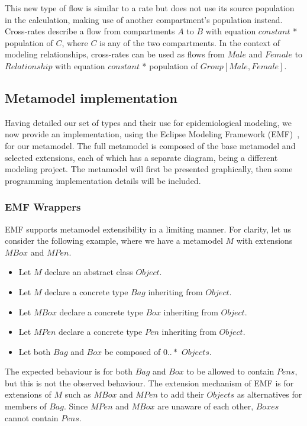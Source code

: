 This new type of flow is similar to a rate but does not use its source population in the calculation, making use of another compartment's population instead. Cross-rates describe a flow from compartments $A$ to $B$ with equation $constant$ * population of $C$, where $C$ is any of the two compartments. In the context of modeling relationships, cross-rates can be used as flows from $Male$ and $Female$ to $Relationship$ with equation $constant$ * population of $Group[Male, Female]$.

\subsection{Metamodel implementation}

Having detailed our set of types and their use for epidemiological modeling, we now provide an implementation, using the Eclipse Modeling Framework (EMF)~\cite{steinberg2008emf}, for our metamodel. The full metamodel is composed of the base metamodel and selected extensions, each of which has a separate diagram, being a different modeling project. The metamodel will first be presented graphically, then some programming implementation details will be included.

\subsubsection{EMF Wrappers}

EMF supports metamodel extensibility in a limiting manner. For clarity, let us consider the following example, where we have a metamodel $M$ with extensions $MBox$ and $MPen$.
\begin{itemize}
    \item Let $M$ declare an abstract class $Object$.
    \item Let $M$ declare a concrete type $Bag$ inheriting from $Object$.
    \item Let $MBox$ declare a concrete type $Box$ inheriting from $Object$.
    \item Let $MPen$ declare a concrete type $Pen$ inheriting from $Object$.
    \item Let both $Bag$ and $Box$ be composed of $0..*$ $Objects$.
\end{itemize}

The expected behaviour is for both $Bag$ and $Box$ to be allowed to contain $Pens$, but this is not the observed behaviour. The extension mechanism of EMF is for extensions of $M$ such as $MBox$ and $MPen$ to add their $Objects$ as alternatives for members of $Bag$. Since $MPen$ and $MBox$ are unaware of each other, $Boxes$ cannot contain $Pens$.

